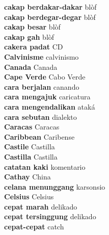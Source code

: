 \textbf{ cakap berdakar-dakar  } blòf \\
\textbf{ cakap berdegar-degar  } blòf \\
\textbf{ cakap besar  } blòf \\
\textbf{ cakap gah  } blòf \\
\textbf{ cakera padat  } CD \\
\textbf{ Calvinisme  } calvinismo \\
\textbf{ Canada  } Canada \\
\textbf{ Cape Verde  } Cabo Verde \\
\textbf{ cara berjalan  } canando \\
\textbf{ cara mengajuk  } caricatura \\
\textbf{ cara mengendalikan  } ataká \\
\textbf{ cara sebutan  } dialekto \\
\textbf{ Caracas  } Caracas \\
\textbf{ Caribbean  } Caribense \\
\textbf{ Castile  } Castilla \\
\textbf{ Castilla  } Castilla \\
\textbf{ catatan kaki  } komentario \\
\textbf{ Cathay  } China \\
\textbf{ celana menunggang  } karsonsio \\
\textbf{ Celsius  } Celsius \\
\textbf{ cepat marah  } delikado \\
\textbf{ cepat tersinggung  } delikado \\
\textbf{ cepat-cepat  } catch \\
